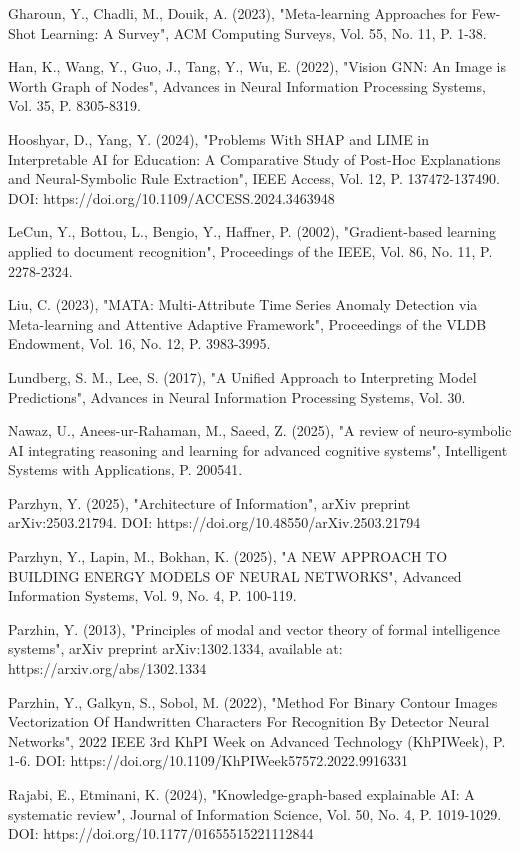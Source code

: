\documentclass[a4paper,10pt]{article}
\begin{document}
Gharoun, Y., Chadli, M., Douik, A. (2023), "Meta-learning Approaches for Few-Shot Learning: A Survey", ACM Computing Surveys, Vol. 55, No. 11, P. 1-38.

Han, K., Wang, Y., Guo, J., Tang, Y., Wu, E. (2022), "Vision GNN: An Image is Worth Graph of Nodes", Advances in Neural Information Processing Systems, Vol. 35, P. 8305-8319.

Hooshyar, D., Yang, Y. (2024), "Problems With SHAP and LIME in Interpretable AI for Education: A Comparative Study of Post-Hoc Explanations and Neural-Symbolic Rule Extraction", IEEE Access, Vol. 12, P. 137472-137490. DOI: https://doi.org/10.1109/ACCESS.2024.3463948

LeCun, Y., Bottou, L., Bengio, Y., Haffner, P. (2002), "Gradient-based learning applied to document recognition", Proceedings of the IEEE, Vol. 86, No. 11, P. 2278-2324.

Liu, C. (2023), "MATA: Multi-Attribute Time Series Anomaly Detection via Meta-learning and Attentive Adaptive Framework", Proceedings of the VLDB Endowment, Vol. 16, No. 12, P. 3983-3995.

Lundberg, S. M., Lee, S. (2017), "A Unified Approach to Interpreting Model Predictions", Advances in Neural Information Processing Systems, Vol. 30.

Nawaz, U., Anees-ur-Rahaman, M., Saeed, Z. (2025), "A review of neuro-symbolic AI integrating reasoning and learning for advanced cognitive systems", Intelligent Systems with Applications, P. 200541.

Parzhyn, Y. (2025), "Architecture of Information", arXiv preprint arXiv:2503.21794. DOI: https://doi.org/10.48550/arXiv.2503.21794

Parzhyn, Y., Lapin, M., Bokhan, K. (2025), "A NEW APPROACH TO BUILDING ENERGY MODELS OF NEURAL NETWORKS", Advanced Information Systems, Vol. 9, No. 4, P. 100-119.

Parzhin, Y. (2013), "Principles of modal and vector theory of formal intelligence systems", arXiv preprint arXiv:1302.1334, available at: https://arxiv.org/abs/1302.1334

Parzhin, Y., Galkyn, S., Sobol, M. (2022), "Method For Binary Contour Images Vectorization Of Handwritten Characters For Recognition By Detector Neural Networks", 2022 IEEE 3rd KhPI Week on Advanced Technology (KhPIWeek), P. 1-6. DOI: https://doi.org/10.1109/KhPIWeek57572.2022.9916331

Rajabi, E., Etminani, K. (2024), "Knowledge-graph-based explainable AI: A systematic review", Journal of Information Science, Vol. 50, No. 4, P. 1019-1029. DOI: https://doi.org/10.1177/01655515221112844
\end{document}
